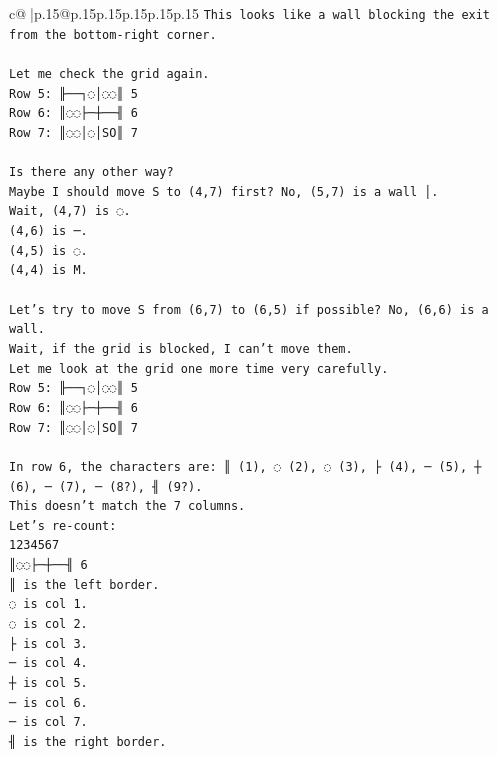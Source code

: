 \documentclass{article}
\begin{document}
{\begin{supertabular}{c@{$\;$}|p{.15\linewidth}@{}p{.15\linewidth}p{.15\linewidth}p{.15\linewidth}p{.15\linewidth}p{.15\linewidth}}
{{{\texttt{This looks like a wall blocking the exit from the bottom{-}right corner.} \\
\\ 
\texttt{Let me check the grid again.} \\
\texttt{Row 5: ╟──┐◌│◌◌║ 5} \\
\texttt{Row 6: ║◌◌├─┼──╢ 6} \\
\texttt{Row 7: ║◌◌│◌│SO║ 7} \\
\\ 
\texttt{Is there any other way?} \\
\texttt{Maybe I should move S to (4,7) first? No, (5,7) is a wall │.} \\
\texttt{Wait, (4,7) is ◌.} \\
\texttt{(4,6) is ─.} \\
\texttt{(4,5) is ◌.} \\
\texttt{(4,4) is M.} \\
\\ 
\texttt{Let's try to move S from (6,7) to (6,5) if possible? No, (6,6) is a wall.} \\
\texttt{Wait, if the grid is blocked, I can't move them.} \\
\texttt{Let me look at the grid one more time very carefully.} \\
\texttt{Row 5: ╟──┐◌│◌◌║ 5} \\
\texttt{Row 6: ║◌◌├─┼──╢ 6} \\
\texttt{Row 7: ║◌◌│◌│SO║ 7} \\
\\ 
\texttt{In row 6, the characters are: ║ (1), ◌ (2), ◌ (3), ├ (4), ─ (5), ┼ (6), ─ (7), ─ (8?), ╢ (9?).} \\
\texttt{This doesn't match the 7 columns.} \\
\texttt{Let's re{-}count:} \\
\texttt{1234567} \\
\texttt{║◌◌├─┼──╢ 6} \\
\texttt{║ is the left border.} \\
\texttt{◌ is col 1.} \\
\texttt{◌ is col 2.} \\
\texttt{├ is col 3.} \\
\texttt{─ is col 4.} \\
\texttt{┼ is col 5.} \\
\texttt{─ is col 6.} \\
\texttt{─ is col 7.} \\
\texttt{╢ is the right border.} \\
}}}
\end{supertabular}}
\end{document}
